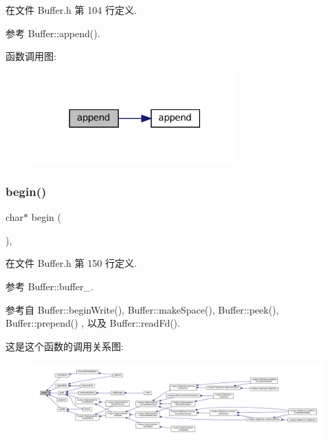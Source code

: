 在文件 Buffer.\+h 第 104 行定义.



参考 Buffer\+::append().

函数调用图\+:
\nopagebreak
\begin{figure}[H]
\begin{center}
\leavevmode
\includegraphics[width=222pt]{classmuduo_1_1Buffer_af4c97664922a815eb9aa9dfe78686007_cgraph}
\end{center}
\end{figure}
\mbox{\label{classmuduo_1_1Buffer_ad431daee7daddf53f8aca682ddf3c940}} 
\subsubsection{\texorpdfstring{begin()}{begin()}\hspace{0.1cm}{\footnotesize\ttfamily [1/2]}}
{\footnotesize\ttfamily char$\ast$ begin (\begin{DoxyParamCaption}{ }\end{DoxyParamCaption})\hspace{0.3cm}{\ttfamily [inline]}, {\ttfamily [private]}}



在文件 Buffer.\+h 第 150 行定义.



参考 Buffer\+::buffer\+\_\+.



参考自 Buffer\+::begin\+Write(), Buffer\+::make\+Space(), Buffer\+::peek(), Buffer\+::prepend() , 以及 Buffer\+::read\+Fd().

这是这个函数的调用关系图\+:
\nopagebreak
\begin{figure}[H]
\begin{center}
\leavevmode
\includegraphics[width=350pt]{classmuduo_1_1Buffer_ad431daee7daddf53f8aca682ddf3c940_icgraph}
\end{center}
\end{figure}
\mbox{\label{classmuduo_1_1Buffer_a5386e98f71cb440232f0c41041f50af4}} 
